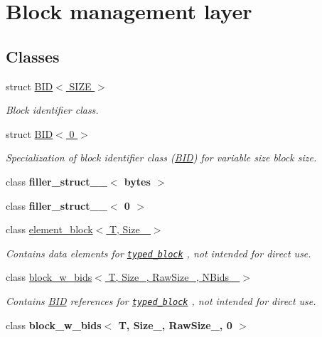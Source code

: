 \hypertarget{group__mnglayer}{
\section{Block management layer}
\label{group__mnglayer}
}
\subsection*{Classes}
\begin{CompactItemize}
\item 
struct \hyperlink{structBID}{BID$<$ SIZE $>$}
\begin{CompactList}\small\item\em Block identifier class. \item\end{CompactList}\item 
struct \hyperlink{structBID_3_010_01_4}{BID$<$ 0 $>$}
\begin{CompactList}\small\item\em Specialization of block identifier class (\hyperlink{structBID}{BID}) for variable size block size. \item\end{CompactList}\item 
class \textbf{filler\_\-struct\_\-\_\-$<$ bytes $>$}
\item 
class \textbf{filler\_\-struct\_\-\_\-$<$ 0 $>$}
\item 
class \hyperlink{classelement__block}{element\_\-block$<$ T, Size\_\- $>$}
\begin{CompactList}\small\item\em Contains data elements for {\tt \hyperlink{classtyped__block}{typed\_\-block}} , not intended for direct use. \item\end{CompactList}\item 
class \hyperlink{classblock__w__bids}{block\_\-w\_\-bids$<$ T, Size\_\-, RawSize\_\-, NBids\_\- $>$}
\begin{CompactList}\small\item\em Contains \hyperlink{structBID}{BID} references for {\tt \hyperlink{classtyped__block}{typed\_\-block}} , not intended for direct use. \item\end{CompactList}\item 
class \textbf{block\_\-w\_\-bids$<$ T, Size\_\-, RawSize\_\-, 0 $>$}
\item 

\end{CompactItemize}
